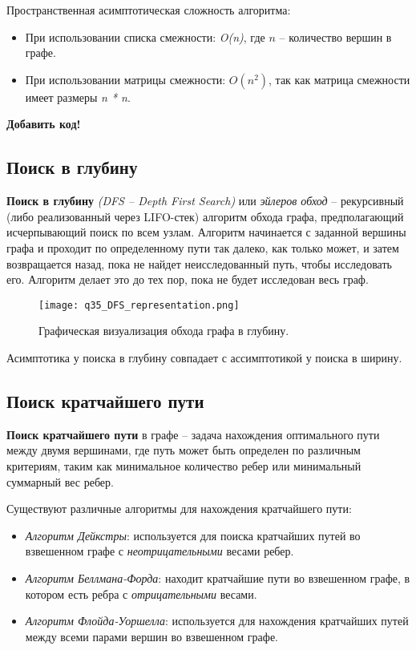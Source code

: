 Пространственная асимптотическая сложность алгоритма: 
\begin{itemize}[label=$\triangleright$, font=\scriptsize, noitemsep, topsep=0pt, partopsep=0pt]
	\item {\footnotesize При использовании списка смежности: \textit{O(n)}, где $n$ -- количество вершин в графе.}
	\item {\footnotesize При использовании матрицы смежности: \textit{$O(n^{2})$}, так как матрица смежности имеет размеры \textit{n * n}.}
\end{itemize}
\vspace{5pt}

{\LARGE \textbf{Добавить код!}}

\subsection{Поиск в глубину}
\textbf{Поиск в глубину} \textit{(DFS -- Depth First Search)} или \textit{эйлеров обход} -- рекурсивный (либо реализованный через LIFO-стек) алгоритм обхода графа, предполагающий исчерпывающий поиск по всем узлам. Алгоритм начинается с заданной вершины графа и проходит по определенному пути так далеко, как только может, и затем возвращается назад, пока не найдет неисследованный путь, чтобы исследовать его. Алгоритм делает это до тех пор, пока не будет исследован весь граф.

\begin{figure}[htbp]
	\centering
	\texttt{[image: q35\_DFS\_representation.png]}
	\caption{Графическая визуализация обхода графа в глубину.}
\end{figure}

Асимптотика у поиска в глубину совпадает с ассимптотикой у поиска в ширину.

\subsection{Поиск кратчайшего пути}
\textbf{Поиск кратчайшего пути} в графе -- задача нахождения оптимального пути между двумя вершинами, где путь может быть определен по различным критериям, таким как минимальное количество ребер или минимальный суммарный вес ребер.

Существуют различные алгоритмы для нахождения кратчайшего пути:
\begin{itemize}[label=$\star$, font=\scriptsize, noitemsep, topsep=0pt, partopsep=0pt]
	\item {\footnotesize \textit{Алгоритм Дейкстры}: используется для поиска кратчайших путей во взвешенном графе с \textit{неотрицательными} весами ребер.}
	\item {\footnotesize \textit{Алгоритм Беллмана-Форда}: находит кратчайшие пути во взвешенном графе, в котором есть ребра с \textit{отрицательными} весами.}
	\item {\footnotesize \textit{Алгоритм Флойда-Уоршелла}: используется для нахождения кратчайших путей между всеми парами вершин во взвешенном графе.}
\end{itemize}


